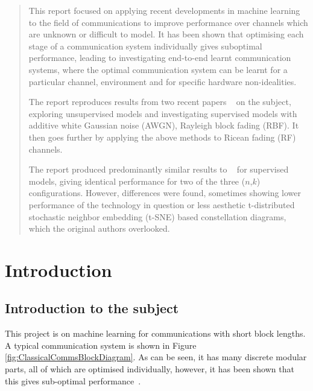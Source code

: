 \documentclass[12pt,onecolumn,letterpaper]{article}
\begin{document}
\begin{abstract}   
   This report focused on applying recent developments in machine learning to the field of communications to improve performance over channels which are unknown or difficult to model. It has been shown that optimising each stage of a communication system individually gives suboptimal performance, leading to investigating end-to-end learnt communication systems, where the optimal communication system can be learnt for a particular channel, environment and for specific hardware non-idealities.
   
   The report reproduces results from two recent papers ~\cite{oShea,Aoudia} on the subject, exploring unsupervised models and investigating supervised models with additive white Gaussian noise (AWGN), Rayleigh block fading (RBF). It then goes further by applying the above methods to Ricean fading (RF) channels.
   
   The report produced predominantly similar results to ~\cite{oShea} for supervised models, giving identical performance for two of the three ($n$,$k$) configurations. However, differences were found, sometimes showing lower performance of the technology in question or less aesthetic t-distributed stochastic neighbor embedding (t-SNE) based constellation diagrams, which the original authors overlooked.
\end{abstract}

\FloatBarrier
\section{Introduction}

\subsection{Introduction to the subject}

This project is on machine learning for communications with short block lengths. A typical communication system is shown in Figure \ref{fig:ClassicalCommsBlockDiagram}. As can be seen, it has many discrete modular parts, all of which are optimised individually, however, it has been shown that this gives sub-optimal performance~\cite{ChannelEncodingOptimality}.
\end{document}
